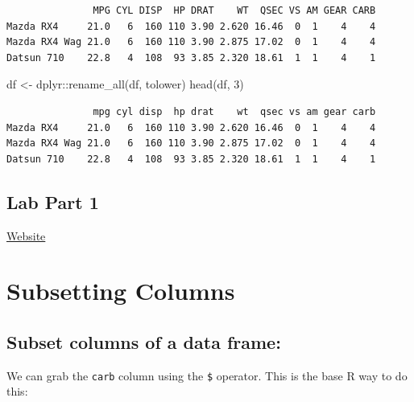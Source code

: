 \documentclass[
]{article}
\newenvironment{Shaded}{\begin{snugshade}}{\end{snugshade}}
\newcommand{\DecValTok}[1]{\textcolor[rgb]{0.00,0.00,0.81}{#1}}
\newcommand{\FunctionTok}[1]{\textcolor[rgb]{0.00,0.00,0.00}{#1}}
\newcommand{\NormalTok}[1]{#1}
\newcommand{\OtherTok}[1]{\textcolor[rgb]{0.56,0.35,0.01}{#1}}
\newcommand{\SpecialCharTok}[1]{\textcolor[rgb]{0.00,0.00,0.00}{#1}}
\begin{document}
\begin{verbatim}
               MPG CYL DISP  HP DRAT    WT  QSEC VS AM GEAR CARB
Mazda RX4     21.0   6  160 110 3.90 2.620 16.46  0  1    4    4
Mazda RX4 Wag 21.0   6  160 110 3.90 2.875 17.02  0  1    4    4
Datsun 710    22.8   4  108  93 3.85 2.320 18.61  1  1    4    1
\end{verbatim}

\begin{Shaded}
\begin{Highlighting}[]
\NormalTok{df }\OtherTok{\textless{}{-}}\NormalTok{ dplyr}\SpecialCharTok{::}\FunctionTok{rename\_all}\NormalTok{(df, tolower)}
\FunctionTok{head}\NormalTok{(df, }\DecValTok{3}\NormalTok{)}
\end{Highlighting}
\end{Shaded}

\begin{verbatim}
               mpg cyl disp  hp drat    wt  qsec vs am gear carb
Mazda RX4     21.0   6  160 110 3.90 2.620 16.46  0  1    4    4
Mazda RX4 Wag 21.0   6  160 110 3.90 2.875 17.02  0  1    4    4
Datsun 710    22.8   4  108  93 3.85 2.320 18.61  1  1    4    1
\end{verbatim}

\hypertarget{lab-part-1}{%
\subsection{Lab Part 1}\label{lab-part-1}}

\href{http://https://jhudatascience.org/intro_to_R_class/index.html}{Website}

\hypertarget{subsetting-columns}{%
\section{Subsetting Columns}\label{subsetting-columns}}

\hypertarget{subset-columns-of-a-data-frame}{%
\subsection{Subset columns of a data
frame:}\label{subset-columns-of-a-data-frame}}

We can grab the \texttt{carb} column using the \texttt{\$} operator.
This is the base R way to do this:

\begin{Shaded}
\end{Shaded}
\end{document}
